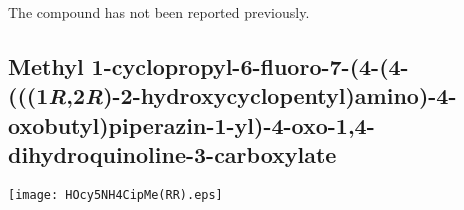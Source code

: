 \\[1\baselineskip]
\\[1\baselineskip]
\\[1\baselineskip]
The compound has not been reported previously.


%
%

\subsection{Methyl 1\hyp{}cyclopropyl\hyp{}6\hyp{}fluoro\hyp{}7\hyp{}(4\hyp{}(4\hyp{}(((1\textit{R},2\textit{R})\hyp{}2\hyp{}hydroxycyclopentyl)amin\allowbreak o)\hyp{}4\hyp{}oxobutyl)piperazin\hyp{}1\hyp{}yl)\hyp{}4\hyp{}oxo\hyp{}1,4\hyp{}dihydroquinoline\hyp{}3\hyp{}carboxylate }


\begin{scheme}[H]
	\begin{center}
		\texttt{[image: HOcy5NH4CipMe(RR).eps]}
	\end{center}
\end{scheme}

